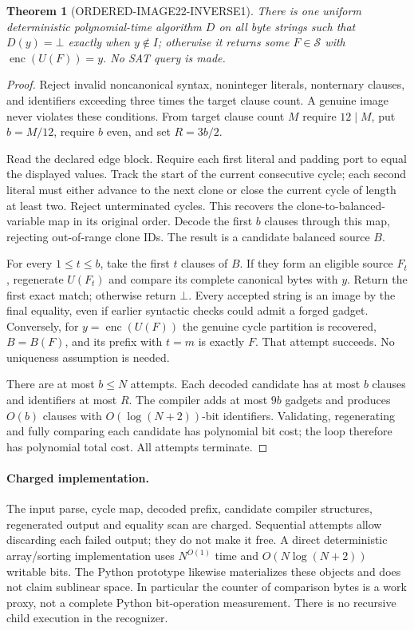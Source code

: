 \documentclass[11pt]{article}
\newtheorem{theorem}{Theorem}
\newcommand{\enc}{\operatorname{enc}}
\begin{document}
\begin{theorem}[ORDERED-IMAGE22-INVERSE1]
There is one uniform deterministic polynomial-time algorithm $D$ on all
byte strings such that $D(y)=\bot$ exactly when $y\notin I$; otherwise it
returns some $F\in\mathcal S$ with $\enc(U(F))=y$. No SAT query is made.
\end{theorem}
\begin{proof}
Reject invalid noncanonical syntax, noninteger literals, nonternary clauses,
and identifiers exceeding three times the target clause count. A genuine
image never violates these conditions. From target clause count $M$ require
$12\mid M$, put $b=M/12$, require $b$ even, and set $R=3b/2$.

Read the declared edge block. Require each first literal and padding port
to equal the displayed values. Track the start of the current consecutive
cycle; each second literal must either advance to the next clone or close
the current cycle of length at least two. Reject unterminated cycles. This
recovers the clone-to-balanced-variable map in its original order. Decode
the first $b$ clauses through this map, rejecting out-of-range clone IDs.
The result is a candidate balanced source $B$.

For every $1\le t\le b$, take the first $t$ clauses of $B$. If they form an
eligible source $F_t$, regenerate $U(F_t)$ and compare its complete canonical
bytes with $y$. Return the first exact match; otherwise return $\bot$.
Every accepted string is an image by the final equality, even if earlier
syntactic checks could admit a forged gadget. Conversely, for $y=\enc(U(F))$
the genuine cycle partition is recovered, $B=B(F)$, and its prefix with
$t=m$ is exactly $F$. That attempt succeeds. No uniqueness assumption is
needed.

There are at most $b\le N$ attempts. Each decoded candidate has at most $b$
clauses and identifiers at most $R$. The compiler adds at most $9b$ gadgets
and produces $O(b)$ clauses with $O(\log(N+2))$-bit identifiers. Validating,
regenerating and fully comparing each candidate has polynomial bit cost;
the loop therefore has polynomial total cost. All attempts terminate.
\end{proof}

\paragraph{Charged implementation.}
The input parse, cycle map, decoded prefix, candidate compiler structures,
regenerated output and equality scan are charged. Sequential attempts allow
discarding each failed output; they do not make it free. A direct deterministic
array/sorting implementation uses $N^{O(1)}$ time and
$O(N\log(N+2))$ writable bits. The Python prototype likewise materializes
these objects and does not claim sublinear space. In particular the counter
of comparison bytes is a work proxy, not a complete Python bit-operation
measurement. There is no recursive child execution in the recognizer.
\end{document}
